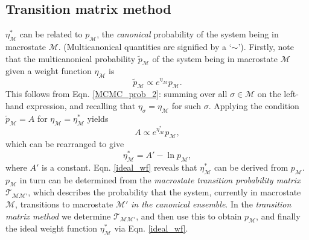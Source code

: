 \documentclass{report}
\begin{document}
\subsection{Transition matrix method}\label{sec:transition_matrix}
$\eta_{\mathcal{M}}^*$ can be related to $p_{\mathcal{M}}$, the \emph{canonical} probability of the system being in macrostate $\mathcal{M}$. (Multicanonical
quantities are signified by a `$\sim$'). Firstly, note that the multicanonical probability $\tilde{p}_{\mathcal{M}}$ of the system being in macrostate 
$\mathcal{M}$ given a weight function $\eta_{\mathcal{M}}$ is
\begin{equation}
\tilde{p}_{\mathcal{M}}\propto e^{\eta_{\mathcal{M}}}p_{\mathcal{M}}.
\end{equation}
This follows from Eqn. \eqref{MCMC_prob_2}: summing over all $\sigma\in\mathcal{M}$ on the left-hand expression, and recalling that 
$\eta_{\sigma}=\eta_{\mathcal{M}}$ for such $\sigma$. Applying the condition $\tilde{p}_{\mathcal{M}}=A$ for $\eta_{\mathcal{M}}=\eta_{\mathcal{M}}^*$ yields
\begin{equation}
A\propto e^{\eta^*_{\mathcal{M}}}p_{\mathcal{M}},
\end{equation}
which can be rearranged to give
\begin{equation}\label{ideal_wf}
\eta^*_{\mathcal{M}}=A'-\ln p_{\mathcal{M}},
\end{equation}
where $A'$ is a constant. Eqn. \eqref{ideal_wf} reveals that $\eta^*_{\mathcal{M}}$ can be derived from $p_{\mathcal{M}}$. $p_{\mathcal{M}}$ 
in turn can be determined from the \emph{macrostate transition probability matrix} $\mathcal{T}_{\mathcal{MM}'}$, which describes the probability that
the system, currently in macrostate $\mathcal{M}$, transitions to macrostate $\mathcal{M}'$ \emph{in the canonical ensemble}.
In the \emph{transition matrix method} \cite{Smith_1995,Fitzgerald_1999} we determine $\mathcal{T}_{\mathcal{MM}'}$, and then use this to obtain
$p_{\mathcal{M}}$, and finally the ideal weight function $\eta_{\mathcal{M}}^*$ via Eqn. \eqref{ideal_wf}.
\end{document}
